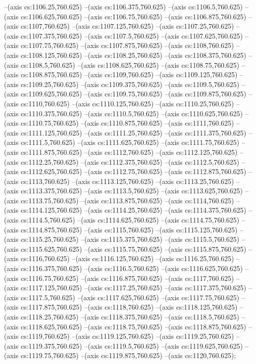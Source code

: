 --(axis cs:1106.25,760.625)
--(axis cs:1106.375,760.625)
--(axis cs:1106.5,760.625)
--(axis cs:1106.625,760.625)
--(axis cs:1106.75,760.625)
--(axis cs:1106.875,760.625)
--(axis cs:1107,760.625)
--(axis cs:1107.125,760.625)
--(axis cs:1107.25,760.625)
--(axis cs:1107.375,760.625)
--(axis cs:1107.5,760.625)
--(axis cs:1107.625,760.625)
--(axis cs:1107.75,760.625)
--(axis cs:1107.875,760.625)
--(axis cs:1108,760.625)
--(axis cs:1108.125,760.625)
--(axis cs:1108.25,760.625)
--(axis cs:1108.375,760.625)
--(axis cs:1108.5,760.625)
--(axis cs:1108.625,760.625)
--(axis cs:1108.75,760.625)
--(axis cs:1108.875,760.625)
--(axis cs:1109,760.625)
--(axis cs:1109.125,760.625)
--(axis cs:1109.25,760.625)
--(axis cs:1109.375,760.625)
--(axis cs:1109.5,760.625)
--(axis cs:1109.625,760.625)
--(axis cs:1109.75,760.625)
--(axis cs:1109.875,760.625)
--(axis cs:1110,760.625)
--(axis cs:1110.125,760.625)
--(axis cs:1110.25,760.625)
--(axis cs:1110.375,760.625)
--(axis cs:1110.5,760.625)
--(axis cs:1110.625,760.625)
--(axis cs:1110.75,760.625)
--(axis cs:1110.875,760.625)
--(axis cs:1111,760.625)
--(axis cs:1111.125,760.625)
--(axis cs:1111.25,760.625)
--(axis cs:1111.375,760.625)
--(axis cs:1111.5,760.625)
--(axis cs:1111.625,760.625)
--(axis cs:1111.75,760.625)
--(axis cs:1111.875,760.625)
--(axis cs:1112,760.625)
--(axis cs:1112.125,760.625)
--(axis cs:1112.25,760.625)
--(axis cs:1112.375,760.625)
--(axis cs:1112.5,760.625)
--(axis cs:1112.625,760.625)
--(axis cs:1112.75,760.625)
--(axis cs:1112.875,760.625)
--(axis cs:1113,760.625)
--(axis cs:1113.125,760.625)
--(axis cs:1113.25,760.625)
--(axis cs:1113.375,760.625)
--(axis cs:1113.5,760.625)
--(axis cs:1113.625,760.625)
--(axis cs:1113.75,760.625)
--(axis cs:1113.875,760.625)
--(axis cs:1114,760.625)
--(axis cs:1114.125,760.625)
--(axis cs:1114.25,760.625)
--(axis cs:1114.375,760.625)
--(axis cs:1114.5,760.625)
--(axis cs:1114.625,760.625)
--(axis cs:1114.75,760.625)
--(axis cs:1114.875,760.625)
--(axis cs:1115,760.625)
--(axis cs:1115.125,760.625)
--(axis cs:1115.25,760.625)
--(axis cs:1115.375,760.625)
--(axis cs:1115.5,760.625)
--(axis cs:1115.625,760.625)
--(axis cs:1115.75,760.625)
--(axis cs:1115.875,760.625)
--(axis cs:1116,760.625)
--(axis cs:1116.125,760.625)
--(axis cs:1116.25,760.625)
--(axis cs:1116.375,760.625)
--(axis cs:1116.5,760.625)
--(axis cs:1116.625,760.625)
--(axis cs:1116.75,760.625)
--(axis cs:1116.875,760.625)
--(axis cs:1117,760.625)
--(axis cs:1117.125,760.625)
--(axis cs:1117.25,760.625)
--(axis cs:1117.375,760.625)
--(axis cs:1117.5,760.625)
--(axis cs:1117.625,760.625)
--(axis cs:1117.75,760.625)
--(axis cs:1117.875,760.625)
--(axis cs:1118,760.625)
--(axis cs:1118.125,760.625)
--(axis cs:1118.25,760.625)
--(axis cs:1118.375,760.625)
--(axis cs:1118.5,760.625)
--(axis cs:1118.625,760.625)
--(axis cs:1118.75,760.625)
--(axis cs:1118.875,760.625)
--(axis cs:1119,760.625)
--(axis cs:1119.125,760.625)
--(axis cs:1119.25,760.625)
--(axis cs:1119.375,760.625)
--(axis cs:1119.5,760.625)
--(axis cs:1119.625,760.625)
--(axis cs:1119.75,760.625)
--(axis cs:1119.875,760.625)
--(axis cs:1120,760.625);

